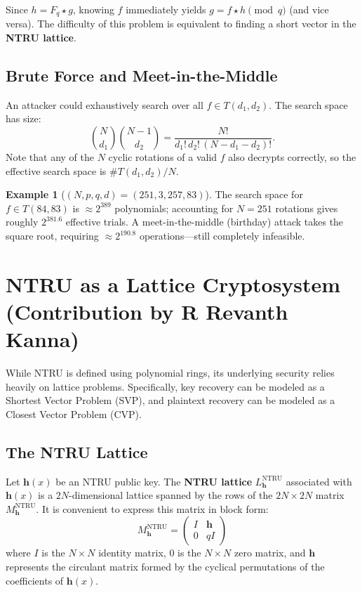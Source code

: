 \documentclass[12pt, a4paper]{article}
\theoremstyle{definition}
\newtheorem{example}{Example}[section]
\theoremstyle{plain}
\begin{document}
Since $h = F_q \star g$, knowing $f$ immediately yields $g = f \star h \pmod q$
(and vice versa). The difficulty of this problem is equivalent to finding a
short vector in the \textbf{NTRU lattice}.

\subsection{Brute Force and Meet-in-the-Middle}

An attacker could exhaustively search over all $f \in T(d_1, d_2)$. The search
space has size:
\[
    \binom{N}{d_1}\binom{N-1}{d_2} = \dfrac{N!}{d_1!\, d_2!\, (N-d_1-d_2)!}.
\]
Note that any of the $N$ cyclic rotations of a valid $f$ also decrypts
correctly, so the effective search space is $\#T(d_1,d_2) / N$.

\begin{example}[$(N, p, q, d) = (251, 3, 257, 83)$]
    The search space for $f \in T(84, 83)$ is $\approx 2^{389}$
    polynomials; accounting for $N = 251$ rotations gives roughly $2^{381.6}$
    effective trials. A meet-in-the-middle (birthday) attack takes the square
    root, requiring $\approx 2^{190.8}$ operations---still completely infeasible.
\end{example}

\section{NTRU as a Lattice Cryptosystem (Contribution by R Revanth Kanna)}

While NTRU is defined using polynomial rings, its underlying security relies heavily on lattice problems. Specifically, key recovery can be modeled as a Shortest Vector Problem (SVP), and plaintext recovery can be modeled as a Closest Vector Problem (CVP).

\subsection{The NTRU Lattice}
Let $\mathbf{h}(x)$ be an NTRU public key. The \textbf{NTRU lattice} $L_{\mathbf{h}}^{\text{NTRU}}$ associated with $\mathbf{h}(x)$ is a $2N$-dimensional lattice spanned by the rows of the $2N \times 2N$ matrix $M_{\mathbf{h}}^{\text{NTRU}}$. It is convenient to express this matrix in block form:
\[
M_{\mathbf{h}}^{\text{NTRU}} = \begin{pmatrix} I & \mathbf{h} \\ 0 & qI \end{pmatrix}
\]
where $I$ is the $N \times N$ identity matrix, $0$ is the $N \times N$ zero matrix, and $\mathbf{h}$ represents the circulant matrix formed by the cyclical permutations of the coefficients of $\mathbf{h}(x)$.
\end{document}
